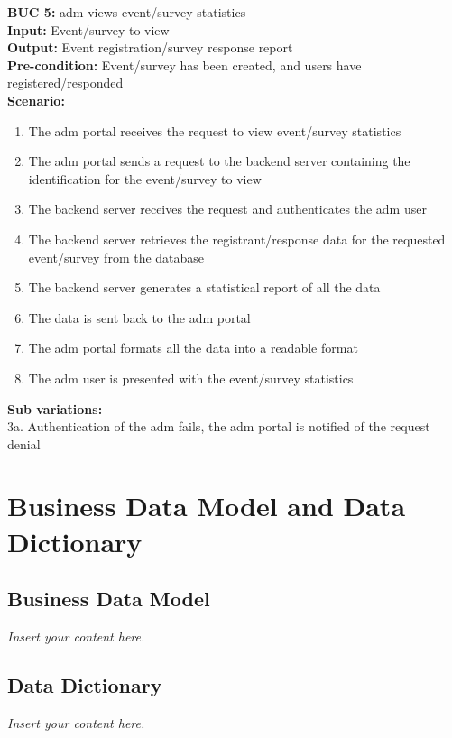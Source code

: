 \documentclass[12pt]{article}
\newcommand{\lips}{\textit{Insert your content here.}}
\begin{document}
\noindent\textbf{BUC 5: } \Gls{adm} views event/survey statistics \\
\textbf{Input:} Event/survey to view \\
\textbf{Output:} Event registration/survey response report \\
\textbf{Pre-condition:} Event/survey has been created, and users have registered/responded \\
\textbf{Scenario:} \\
\begin{enumerate}
  \item The \gls{adm} portal receives the request to view event/survey statistics
  \item The \gls{adm} portal sends a request to the backend server containing the identification for the event/survey to view
  \item The backend server receives the request and authenticates the \gls{adm} user
  \item The backend server retrieves the registrant/response data for the requested event/survey from the database
  \item The backend server generates a statistical report of all the data
  \item The data is sent back to the \gls{adm} portal
  \item The \gls{adm} portal formats all the data into a readable format
  \item The \gls{adm} user is presented with the event/survey statistics
\end{enumerate}
\textbf{Sub variations:} \\
3a. Authentication of the \gls{adm} fails, the \gls{adm} portal is notified of the request denial \\


\section{Business Data Model and Data Dictionary}
\subsection{Business Data Model}
\lips
\subsection{Data Dictionary}
\lips
\end{document}
